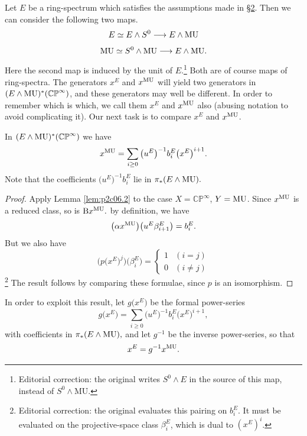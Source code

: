 \documentclass[../main]{subfiles}
\begin{document}
Let $E$ be a ring-spectrum which satisfies the assumptions made in \hyperref[sec:p2c2]{\S 2}. Then we can consider the following two maps.
\[E\simeq E\wedge S^0\longrightarrow E\wedge \mathrm{MU}\]
\[\mathrm{MU}\simeq S^0\wedge \mathrm{MU}\longrightarrow E\wedge \mathrm{MU}.\]
Here the second map is induced by the unit of $E$.\footnote{Editorial correction: the original writes $S^0\wedge E$ in the source of this map, instead of $S^0\wedge\mathrm{MU}$.}
Both are of course maps of ring-spectra. The generators $x^E$ and $x^{\mathrm{MU}}$ will yield two generators in $(E\wedge \mathrm{MU})^\ast(\mathbb{CP}^\infty)$, and these generators may well be different. In order to remember which is which, we call them $x^E$ and $x^{\mathrm{MU}}$ also (abusing notation to avoid complicating it). Our next task is to compare $x^E$ and $x^{\mathrm{MU}}$.
\begin{lemma}
\label{lem:p2c06.3}
In $(E\wedge \mathrm{MU})^\ast(\mathbb{CP}^\infty)$ we have 
\[x^{\mathrm{MU}}=\sum_{i\geq 0}\big(u^E\big)^{-1}b_i^E\big(x^E\big)^{i+1}.\]
Note that the coefficients $\big(u^E\big)^{-1}b_i^E$ lie in $\pi_\ast(E\wedge \mathrm{MU}).$
\end{lemma}
\begin{proof}
Apply Lemma \ref{lem:p2c06.2} to the case $X=\mathbb{CP}^\infty$, $Y=\mathrm{MU}$. Since $x^{\mathrm{MU}}$ is a reduced class, so is $\mathrm{B}x^{\mathrm{MU}}.$ by definition, we have 
\[\big(\alpha x^{\mathrm{MU}}\big)\big(u^E\beta_{i+1}^E\big)=b_i^E.\]
But we also have 
\[\Big(p\big(x^E\big)^j\Big)\big(\beta_i^E\big)=\begin{cases}1 & (i=j) \\ 0 &(i\neq j)\end{cases}\]
\footnote{Editorial correction: the original evaluates this pairing on $b_i^E$. It must be evaluated on the projective-space class $\beta_i^E$, which is dual to $(x^E)^i$.}
The result follows by comparing these formulae, since $p$ is an isomorphism. 
\end{proof}


In order to exploit this result, let $g\big(x^E\big)$ be the formal power-series
\begin{equation}
\label{eqn:p2c06.4}
\tag{6.4}
    g\big(x^E\big)=\sum_{i\geq 0}\big(u^E\big)^{-1}b_i^E\big(x^E\big)^{i+1},
\end{equation}
with coefficients in $\pi_\ast(E\wedge \mathrm{MU}),$ and let $g^{-1}$ be the inverse power-series, so that
\[x^E=g^{-1}x^{\mathrm{MU}}.\]
\end{document}
